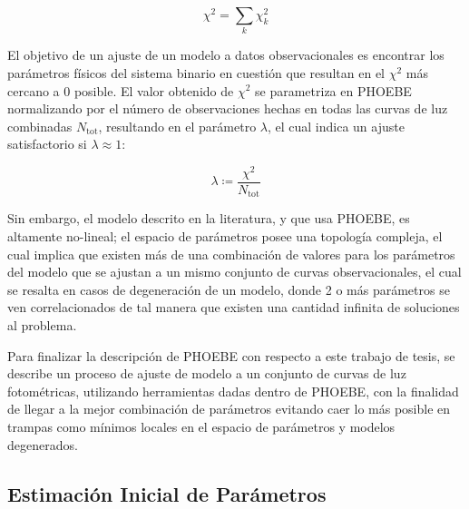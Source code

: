 \begin{eqfloat}[!ht]
	\centering
	\begin{equation}
		\chi^2 = \sum_{k}{\chi_{k}^{2}}
	\end{equation}
	\blankcaption
	\vspace{-0.4em}
	\label{ecuacionChi2}
\end{eqfloat}

El objetivo de un ajuste de un modelo a datos observacionales es encontrar los
parámetros físicos del sistema binario en cuestión que resultan en el $\chi^{2}$
más cercano a 0 posible. El valor obtenido de $\chi^2$ se parametriza en PHOEBE
normalizando por el número de observaciones hechas en todas las curvas de luz
combinadas $N_{\mathrm{tot}}$, resultando en el parámetro $\lambda$, el cual
indica un ajuste satisfactorio si $\lambda \approx 1$:

\begin{eqfloat}
	\centering
	\begin{equation}
		\lambda \coloneq \frac{\chi^2}{N_{\textrm{tot}}}
	\end{equation}
\end{eqfloat}

Sin embargo, el modelo descrito en la literatura, y que
usa PHOEBE, es altamente no-lineal; el espacio de parámetros posee una topología
compleja, el cual implica que existen más de una combinación de valores para los
parámetros del modelo que se ajustan a un mismo conjunto de curvas
observacionales, el cual se resalta en casos de degeneración de un modelo, donde
2 o más parámetros se ven correlacionados de tal manera que existen una cantidad
infinita de soluciones al problema. 

Para finalizar la descripción de PHOEBE con
respecto a este trabajo de tesis, se describe un proceso de ajuste de modelo a
un conjunto de curvas de luz fotométricas, utilizando herramientas dadas dentro
de PHOEBE, con la finalidad de llegar a la mejor combinación de parámetros
evitando caer lo más posible en trampas como mínimos locales en el espacio de
parámetros y modelos degenerados.

\subsection{Estimación Inicial de Parámetros}

